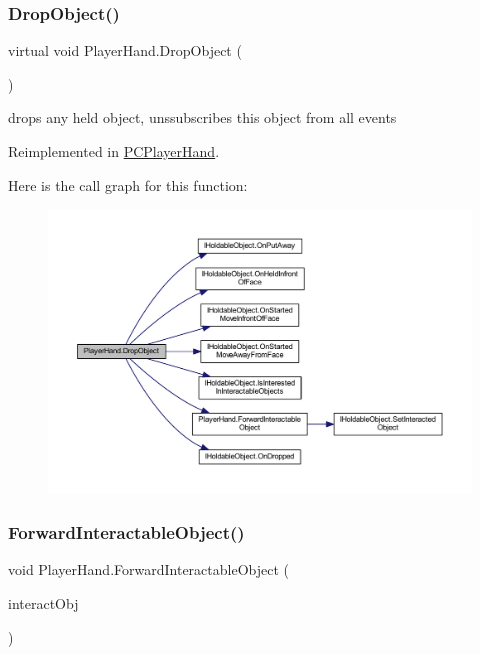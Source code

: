 \subsubsection{\texorpdfstring{Drop\+Object()}{DropObject()}}
{\footnotesize\ttfamily virtual void Player\+Hand.\+Drop\+Object (\begin{DoxyParamCaption}{ }\end{DoxyParamCaption})\hspace{0.3cm}{\ttfamily [virtual]}}



drops any held object, unssubscribes this object from all events 



Reimplemented in \mbox{\hyperlink{class_p_c_player_hand_a42c7ffd95f8493901c93e2c1e4576585}{P\+C\+Player\+Hand}}.

Here is the call graph for this function\+:
\nopagebreak
\begin{figure}[H]
\begin{center}
\leavevmode
\includegraphics[width=350pt]{class_player_hand_a3b127b846b420ef37cba3a3a8de68e78_cgraph}
\end{center}
\end{figure}
\mbox{\label{class_player_hand_a67095e4c1db1e3369c435dd1fe1ebec5}} 
\subsubsection{\texorpdfstring{Forward\+Interactable\+Object()}{ForwardInteractableObject()}}
{\footnotesize\ttfamily void Player\+Hand.\+Forward\+Interactable\+Object (\begin{DoxyParamCaption}\item[{\mbox{\hyperlink{class_player_interaction_event_args}{Player\+Interaction\+Event\+Args}}}]{interact\+Obj }\end{DoxyParamCaption})}



